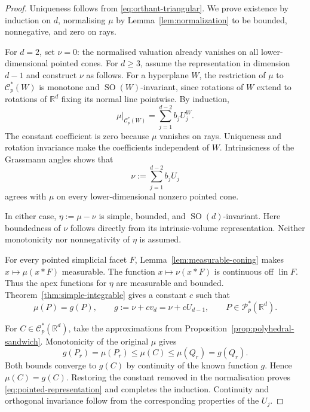 \documentclass[10pt,a4paper]{amsart}
\newcommand{\CC}{\mathcal{C}}
\newcommand{\PP}{\mathcal{P}}
\newcommand{\R}{\mathbb{R}}
\newcommand{\SO}{\operatorname{SO}}
\newcommand{\SOn}[1]{\operatorname{SO}(#1)}
\newcommand{\lin}{\operatorname{lin}}
\begin{document}
\begin{proof}
Uniqueness follows from \eqref{eq:orthant-triangular}.
We prove existence by induction on $d$, normalising $\mu$ by
Lemma~\ref{lem:normalization} to be bounded, nonnegative, and zero
on rays.

For $d=2$, set $\nu=0$: the normalised valuation already vanishes
on all lower-dimen\-sional pointed cones.
For $d\ge3$, assume the representation in dimension $d-1$ and
construct $\nu$ as follows.
For a hyperplane $W$, the restriction of $\mu$ to $\CC_p^*(W)$ is
monotone and $\SO(W)$-invariant, since rotations of $W$ extend to
rotations of $\R^d$ fixing its normal line pointwise.
By induction,
\[
  \mu|_{\CC_p^*(W)}=\sum_{j=1}^{d-2}b_jU_j^W.
\]
The constant coefficient is zero because $\mu$ vanishes on rays.
Uniqueness and rotation invariance make the coefficients independent
of $W$.  Intrinsicness of the Grassmann angles shows that
\[
  \nu:=\sum_{j=1}^{d-2}b_jU_j
\]
agrees with $\mu$ on every lower-dimensional nonzero pointed cone.

In either case, $\eta:=\mu-\nu$ is simple, bounded, and
$\SOn d$-invariant.
Here boundedness of $\nu$ follows directly from its intrinsic-volume
representation.  Neither monotonicity nor nonnegativity of $\eta$
is assumed.

For every pointed simplicial facet $F$,
Lemma~\ref{lem:measurable-coning} makes $x\mapsto\mu(x*F)$ measurable.
The function $x\mapsto\nu(x*F)$ is continuous off $\lin F$.
Thus the apex functions for $\eta$ are measurable and bounded.
Theorem~\ref{thm:simple-integrable} gives a constant $c$ such that
\[
  \mu(P)=g(P),\qquad
  g:=\nu+cv_d=\nu+cU_{d-1},
  \qquad P\in\PP_p^*(\R^d).
\]

For $C\in\CC_p^*(\R^d)$, take the approximations from
Proposition~\ref{prop:polyhedral-sandwich}.  Monotonicity of the
original $\mu$ gives
\begin{equation}\label{eq:monotone-sandwich}
  g(P_r)=\mu(P_r)\le\mu(C)\le\mu(Q_r)=g(Q_r).
\end{equation}
Both bounds converge to $g(C)$ by continuity of the known function $g$.
Hence $\mu(C)=g(C)$.  Restoring the constant removed in the
normalisation proves \eqref{eq:pointed-representation} and completes
the induction.  Continuity and orthogonal invariance follow from
the corresponding properties of the $U_j$.
\end{proof}
\end{document}
